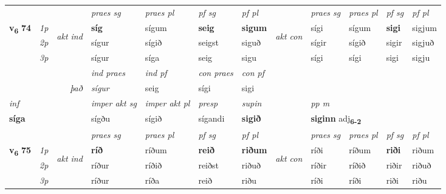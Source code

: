 \begin{longtable}[l]{X>{\footnotesize\itshape}llXXXXlXXXX}
 & &   & \textit{praes sg}  & \textit{praes pl}    & \textit{ pf sg} & \textit{pf pl} & & \textit{praes sg}  & \textit{praes pl}    & \textit{pf sg} & \textit{pf pl }  \\ \cmidrule{4-7} \cmidrule{9-12}
 \multirow{2}{*}{{{\textbf{v{\textsubscript{6}}} \Large{\textbf{74}}}}}  & 1p & \multirow{3}{*}{\begin{turn}{90}\textit{akt ind}\end{turn}} & \textbf{síg} & sígum & \textbf{seig} & \textbf{sigum} & \multirow{3}{*}{\begin{turn}{90}\textit{akt con}\end{turn}} &sígi & sígum & \textbf{sigi} & sigjum\\*
 & 2p &  &  sígur  & sígið & seigst & siguð & & sígir & sígið & sigir & sigjuð \\*
 & 3p &  & sígur & síga & seig & sigu & & sígi & sígi& sigi & sigju \\*
\cmidrule{4-7} \cmidrule{9-12}

   && &  \textit{ind praes} & \textit{ind pf} & \textit{con praes} & \textit{con pf} \\*
\multicolumn{3}{r}{\textit{það}} & sígur & seig & sígi & sigi \\*

\cmidrule{4-7}
   {\textit{inf}} & &  & \textit{imper akt sg} & \textit{imper akt pl}   & \textit{presp} & \textit{supin}  && \textit{pp m} \\*
  {\textbf{síga}} & && sígðu  & sígið   & sígandi &  \textbf{sigið}  && \multicolumn{2}{l}{\textbf{siginn} adj\textbf{\textsubscript{6-2}}} \\*

\midrule

 & &   & \textit{praes sg}  & \textit{praes pl}    & \textit{ pf sg} & \textit{pf pl} & & \textit{praes sg}  & \textit{praes pl}    & \textit{pf sg} & \textit{pf pl }  \\ \cmidrule{4-7} \cmidrule{9-12}
 \multirow{2}{*}{{{\textbf{v{\textsubscript{6}}} \Large{\textbf{75}}}}}  & 1p & \multirow{3}{*}{\begin{turn}{90}\textit{akt ind}\end{turn}} & \textbf{ríð} & ríðum & \textbf{reið} & \textbf{riðum} & \multirow{3}{*}{\begin{turn}{90}\textit{akt con}\end{turn}} &ríði & ríðum & \textbf{riði} & riðum\\*
 & 2p &  &  ríður  & ríðið & reiðst & riðuð & & ríðir & ríðið & riðir & riðuð \\*
 & 3p &  & ríður & ríða & reið & riðu & & ríði & ríði& riði & riðu \\*
\cmidrule{4-7} \cmidrule{9-12}


\end{longtable}
